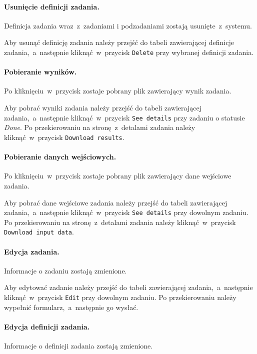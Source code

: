 \documentclass[a4paper,11pt,twoside]{report}
\theoremstyle{definition}
\begin{document}
            \paragraph{Usunięcie definicji zadania.}    
                \noindent Definicja zadania wraz~z~zadaniami i podzadaniami zostają usunięte~z~systemu.
                
                Aby usunąć definicję zadania należy przejść do tabeli zawierającej definicje zadania,~a~następnie kliknąć~w~przycisk \texttt{Delete} przy wybranej definicji zadania. 

            \paragraph{Pobieranie wyników.} 
                \noindent Po kliknięciu~w~przycisk zostaje pobrany plik zawierający
                wynik zadania.
                
                Aby pobrać wyniki zadania należy przejść do tabeli zawierającej zadania,~a~następnie kliknąć~w~przycisk \texttt{See details} przy zadaniu o statusie \textit{Done}. Po przekierowaniu na stronę~z~detalami zadania należy kliknąć~w~przycisk \texttt{Download results}.

            \paragraph{Pobieranie danych wejściowych.}  
                \noindent Po kliknięciu~w~przycisk zostaje pobrany plik zawierający dane wejściowe zadania.
                
                Aby pobrać dane wejściowe zadania należy przejść do tabeli zawierającej zadania,~a~następnie kliknąć~w~przycisk \texttt{See details} przy dowolnym zadaniu. Po przekierowaniu na stronę~z~detalami zadania należy kliknąć~w~przycisk \texttt{Download input data}.

            \paragraph{Edycja zadania.}  
                \noindent Informacje o zadaniu zostają zmienione.
                
                Aby edytować zadanie należy przejść do tabeli zawierającej zadania,~a~następnie kliknąć~w~przycisk \texttt{Edit} przy dowolnym zadaniu. Po przekierowaniu należy wypełnić formularz,~a~następnie go wysłać.

            \paragraph{Edycja definicji zadania.}    
                \noindent Informacje o definicji zadania zostają zmienione.
                
\end{document}
